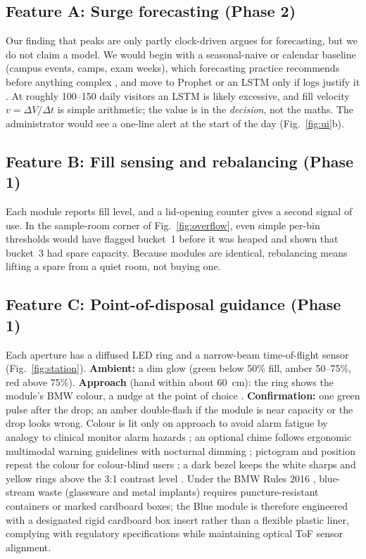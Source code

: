 \documentclass[10pt,twocolumn,a4paper]{article}
\newcommand{\figref}[1]{Fig.~\ref{#1}}
\begin{document}
\subsection{Feature A: Surge forecasting (Phase 2)}
Our finding that peaks are only partly clock-driven argues for forecasting, but we do not claim a model. We would begin with a seasonal-naive or calendar baseline (campus events, camps, exam weeks), which forecasting practice recommends before anything complex \cite{hyndman2021}, and move to Prophet or an LSTM only if logs justify it \cite{taylor2018,hochreiter1997}. At roughly 100--150 daily visitors an LSTM is likely excessive, and fill velocity $v=\Delta V/\Delta t$ is simple arithmetic; the value is in the \emph{decision}, not the maths. The administrator would see a one-line alert at the start of the day (\figref{fig:ui}b).

\subsection{Feature B: Fill sensing and rebalancing (Phase 1)}
Each module reports fill level, and a lid-opening counter gives a second signal of use. In the sample-room corner of \figref{fig:overflow}, even simple per-bin thresholds would have flagged bucket~1 before it was heaped and shown that bucket~3 had spare capacity. Because modules are identical, rebalancing means lifting a spare from a quiet room, not buying one.

\subsection{Feature C: Point-of-disposal guidance (Phase 1)}
Each aperture has a diffused LED ring and a narrow-beam time-of-flight sensor (\figref{fig:station}). \textbf{Ambient:} a dim glow (green below 50\% fill, amber 50--75\%, red above 75\%). \textbf{Approach} (hand within about 60~cm): the ring shows the module's BMW colour, a nudge at the point of choice \cite{thaler2008}. \textbf{Confirmation:} one green pulse after the drop; an amber double-flash if the module is near capacity or the drop looks wrong. Colour is lit only on approach to avoid alarm fatigue by analogy to clinical monitor alarm hazards \cite{sendelbach2013}; an optional chime follows ergonomic multimodal warning guidelines with nocturnal dimming \cite{wickens2013}; pictogram and position repeat the colour for colour-blind users \cite{birch2012}; a dark bezel keeps the white sharps and yellow rings above the 3:1 contrast level \cite{wcag2023}. Under the BMW Rules 2016 \cite{bmw2016}, blue-stream waste (glassware and metal implants) requires puncture-resistant containers or marked cardboard boxes; the Blue module is therefore engineered with a designated rigid cardboard box insert rather than a flexible plastic liner, complying with regulatory specifications while maintaining optical ToF sensor alignment.
\end{document}

